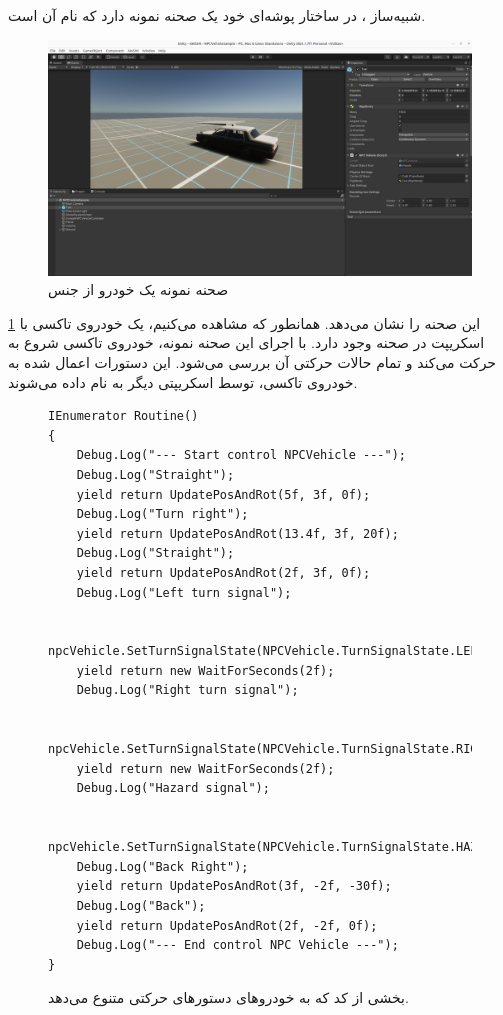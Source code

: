 شبیه‌ساز ، در ساختار پوشه‌ای خود یک صحنه نمونه دارد که نام آن  است. 
\begin{figure}[h!]
    \centering
    \includegraphics[width=1\linewidth]{figures/NPCVehicleSample.png}
    \caption{صحنه نمونه یک خودرو از جنس }
    \label{fig:NPCVehicleSample}
\end{figure}
\cref{fig:NPCVehicleSample} این صحنه را نشان می‌دهد. همانطور که مشاهده می‌کنیم، یک خودروی تاکسی با اسکریپت  در صحنه وجود دارد. با اجرای این صحنه نمونه، خودروی تاکسی شروع به حرکت می‌کند و تمام حالات حرکتی آن بررسی می‌شود. این دستورات اعمال شده به خودروی تاکسی، توسط اسکریپتی دیگر به نام  داده می‌شوند.

\begin{figure}[h!]
    \centering
    \begin{latin}
        \begin{lstlisting}[style=codecs]
IEnumerator Routine()
{
    Debug.Log("--- Start control NPCVehicle ---");
    Debug.Log("Straight");
    yield return UpdatePosAndRot(5f, 3f, 0f);
    Debug.Log("Turn right");
    yield return UpdatePosAndRot(13.4f, 3f, 20f);
    Debug.Log("Straight");
    yield return UpdatePosAndRot(2f, 3f, 0f);
    Debug.Log("Left turn signal");

    npcVehicle.SetTurnSignalState(NPCVehicle.TurnSignalState.LEFT);
    yield return new WaitForSeconds(2f);
    Debug.Log("Right turn signal");

    npcVehicle.SetTurnSignalState(NPCVehicle.TurnSignalState.RIGHT);
    yield return new WaitForSeconds(2f);
    Debug.Log("Hazard signal");

    npcVehicle.SetTurnSignalState(NPCVehicle.TurnSignalState.HAZARD);
    Debug.Log("Back Right");
    yield return UpdatePosAndRot(3f, -2f, -30f);
    Debug.Log("Back");
    yield return UpdatePosAndRot(2f, -2f, 0f);
    Debug.Log("--- End control NPC Vehicle ---");
}
        \end{lstlisting}
    \end{latin}
    \caption{بخشی از کد  که به خودروهای  دستورهای حرکتی متنوع می‌دهد.}
    \label{fig:NPCVehicleController1}
\end{figure}


